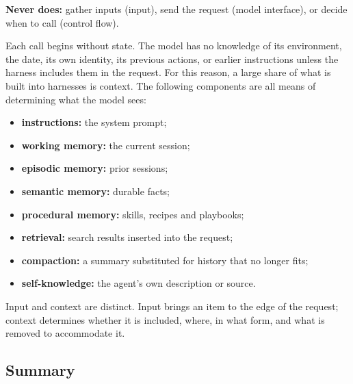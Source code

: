 \textbf{Never does:} gather inputs (input), send the request (model interface), or decide when to call (control flow).

Each call begins without state. The model has no knowledge of its environment, the date, its own identity, its previous actions, or earlier instructions unless the harness includes them in the request. For this reason, a large share of what is built into harnesses is context. The following components are all means of determining what the model sees:

\begin{itemize}
\tightlist
\item
  \textbf{instructions:} the system prompt;
\item
  \textbf{working memory:} the current session;
\item
  \textbf{episodic memory:} prior sessions;
\item
  \textbf{semantic memory:} durable facts;
\item
  \textbf{procedural memory:} skills, recipes and playbooks;
\item
  \textbf{retrieval:} search results inserted into the request;
\item
  \textbf{compaction:} a summary substituted for history that no longer fits;
\item
  \textbf{self-knowledge:} the agent's own description or source.
\end{itemize}

Input and context are distinct. Input brings an item to the edge of the request; context determines whether it is included, where, in what form, and what is removed to accommodate it.

\subsection{Summary}

